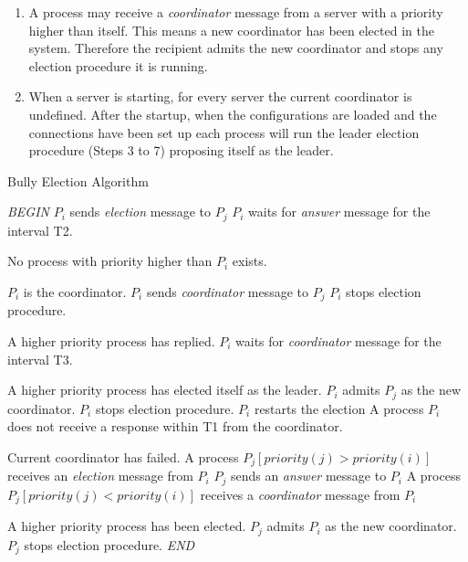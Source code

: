 \documentclass[dareport.tex]{subfiles}
\begin{document}
\begin{enumerate}[leftmargin=*]
	\item A process may receive a \emph{coordinator} message from a server with a priority higher than itself. This means a new coordinator has been elected in the system. Therefore the recipient admits the new coordinator and stops any election procedure it is running.
	\item When a server is starting, for every server the current coordinator is undefined. After the startup, when the configurations are loaded and the connections have been set up each process will run the leader election procedure (Steps 3 to 7) proposing itself as the leader.
\end{enumerate}

\begin{algorithm}[H]
	\caption{Bully Election Algorithm}
	\label{bully-algorithm}
	\begin{algorithmic}[1]
		\BState \emph{BEGIN}
			\State $P_{i}$ sends \emph{election} message to $P_{j}$
		\EndFor
		\State $P_{i}$ waits for \emph{answer} message for the interval T2.
		
		\Comment No process with priority higher than $P_{i}$ exists.
		
		\Comment $P_{i}$ is the coordinator.
				\State $P_{i}$ sends \emph{coordinator} message to $P_{j}$
			\EndFor
			\State $P_{i}$ stops election procedure.
		\Else
		
		\Comment A higher priority process has replied.
			\State $P_{i}$ waits for \emph{coordinator} message for the interval T3.
		
		\Comment A higher priority process has elected itself as the leader.
			\State $P_{i}$ admits $P_{j}$ as the new coordinator.
			\State $P_{i}$ stops election procedure.
		\Else
			\State {}
			\Comment $P_{i}$ restarts the election
		\EndIf
		\EndIf
		\EndProcedure
		\State A process $P_{i}$ does not receive a response within T1 from the coordinator.
		
		\Comment Current coordinator has failed.
		\State\indent {}
		\State A process $P_{j} \left[priority(j) > priority(i)\right]$ receives an \emph{election} message from $P_{i}$
		\State\indent $P_{j}$ sends an \emph{answer} message to $P_{i}$
		\State\indent {}
		\State A process $P_{j} \left[priority(j) < priority(i)\right]$ receives a \emph{coordinator} message from $P_{i}$
		
		\Comment A higher priority process has been elected.
		\State\indent $P_{j}$ admits $P_{i}$ as the new coordinator.
		\State\indent $P_{j}$ stops election procedure.
		\BState \emph{END}
	\end{algorithmic}
\end{algorithm}
\end{document}
